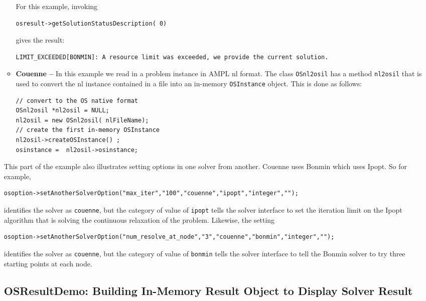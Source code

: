 \documentclass[11pt]{article}
\renewcommand{\_}{{\char"5F}}
\renewcommand{\{}{{\char"7B}}
\renewcommand{\}}{{\char"7D}}
\renewcommand{\^}{{\char"0D}}
\renewcommand{\'}{{\char"0D}}
\begin{document}
\begin{enumerate}[Step 1:]
\begin{itemize}
For this example, invoking
\begin{verbatim}
osresult->getSolutionStatusDescription( 0)
\end{verbatim}
gives the result:
\begin{verbatim}
LIMIT_EXCEEDED[BONMIN]: A resource limit was exceeded, we provide the current solution.
\end{verbatim}


\item {\bf Couenne --}   In this example we read in a problem instance in AMPL nl format.  
The class {\tt OSnl2osil}  has a method {\tt nl2osil} that is used to convert the nl instance 
contained in a file into an in-memory {\tt OSInstance} object. This is done as follows:

\begin{verbatim}
// convert to the OS native format
OSnl2osil *nl2osil = NULL;
nl2osil = new OSnl2osil( nlFileName);
// create the first in-memory OSInstance
nl2osil->createOSInstance() ;
osinstance =  nl2osil->osinstance;
\end{verbatim}
\end{itemize}

This part of the example also illustrates setting options in one solver from another. 
Couenne uses Bonmin which uses Ipopt.  So for example,

\begin{verbatim}
osoption->setAnotherSolverOption("max_iter","100","couenne","ipopt","integer","");
\end{verbatim}
identifies the solver as {\tt couenne}, but the category of value of {\tt ipopt}  tells the solver 
interface to set the iteration limit on the Ipopt algorithm that is solving the continuous relaxation 
of the problem.  Likewise, the setting
\begin{verbatim}
osoption->setAnotherSolverOption("num_resolve_at_node","3","couenne","bonmin","integer","");
\end{verbatim}
identifies the solver as {\tt couenne}, but the category of value of {\tt bonmin}  tells the solver 
interface to tell the Bonmin solver to try three starting points at each node. 

 

\subsection{OSResultDemo: Building In-Memory Result Object to Display Solver Result}\label{section:exampleOSResultDemo}


\end{enumerate}
\end{document}
